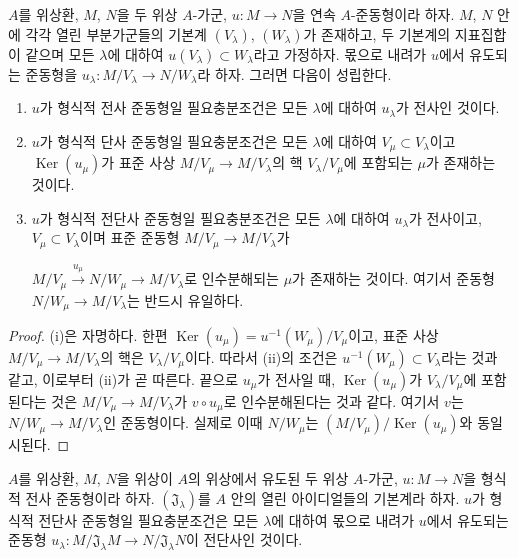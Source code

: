 \begin{proposition}[19.1.3]
\label{0.19.1.3-fr}
$A$를 위상환, $M$, $N$을 두 위상 $A$-가군,
$u:M\to N$을 연속 $A$-준동형이라 하자. $M$, $N$ 안에 각각 열린
부분가군들의 기본계 $(V_\lambda)$, $(W_\lambda)$가 존재하고, 두
기본계의 지표집합이 같으며 모든 $\lambda$에 대하여
$u(V_\lambda)\subset W_\lambda$라고 가정하자. 몫으로 내려가
$u$에서 유도되는 준동형을
$u_\lambda:M/V_\lambda\to N/W_\lambda$라 하자. 그러면 다음이
성립한다.
\begin{enumerate}
  \item[(i)] $u$가 형식적 전사 준동형일 필요충분조건은 모든
  $\lambda$에 대하여 $u_\lambda$가 전사인 것이다.
  \item[(ii)] $u$가 형식적 단사 준동형일 필요충분조건은 모든
  $\lambda$에 대하여 $V_\mu\subset V_\lambda$이고
  $\operatorname{Ker}(u_\mu)$가 표준 사상
  $M/V_\mu\to M/V_\lambda$의 핵 $V_\lambda/V_\mu$에 포함되는
  $\mu$가 존재하는 것이다.
  \item[(iii)] $u$가 형식적 전단사 준동형일 필요충분조건은 모든
  $\lambda$에 대하여 $u_\lambda$가 전사이고,
  $V_\mu\subset V_\lambda$이며 표준 준동형
  $M/V_\mu\to M/V_\lambda$가


  \noindent
  $M/V_\mu\xrightarrow{u_\mu}N/W_\mu\to M/V_\lambda$로
  인수분해되는 $\mu$가 존재하는 것이다. 여기서 준동형
  $N/W_\mu\to M/V_\lambda$는 반드시 유일하다.
\end{enumerate}
\end{proposition}

\begin{proof}
(i)은 자명하다. 한편
$\operatorname{Ker}(u_\mu)=u^{-1}(W_\mu)/V_\mu$이고, 표준 사상
$M/V_\mu\to M/V_\lambda$의 핵은 $V_\lambda/V_\mu$이다.
따라서 (ii)의 조건은 $u^{-1}(W_\mu)\subset V_\lambda$라는 것과
같고, 이로부터 (ii)가 곧 따른다. 끝으로 $u_\mu$가 전사일 때,
$\operatorname{Ker}(u_\mu)$가 $V_\lambda/V_\mu$에 포함된다는
것은 $M/V_\mu\to M/V_\lambda$가 $v\circ u_\mu$로
인수분해된다는 것과 같다. 여기서 $v$는
$N/W_\mu\to M/V_\lambda$인 준동형이다. 실제로 이때
$N/W_\mu$는
$(M/V_\mu)/\operatorname{Ker}(u_\mu)$와 동일시된다.
\end{proof}

\begin{corollary}[19.1.4]
\label{0.19.1.4-fr}
$A$를 위상환, $M$, $N$을 위상이 $A$의 위상에서 유도된 두 위상
$A$-가군, $u:M\to N$을 형식적 전사 준동형이라 하자.
$(\mathfrak J_\lambda)$를 $A$ 안의 열린 아이디얼들의 기본계라 하자.
$u$가 형식적 전단사 준동형일 필요충분조건은 모든 $\lambda$에
대하여 몫으로 내려가 $u$에서 유도되는 준동형
$u_\lambda:M/\mathfrak J_\lambda M\to
N/\mathfrak J_\lambda N$이 전단사인 것이다.
\end{corollary}

